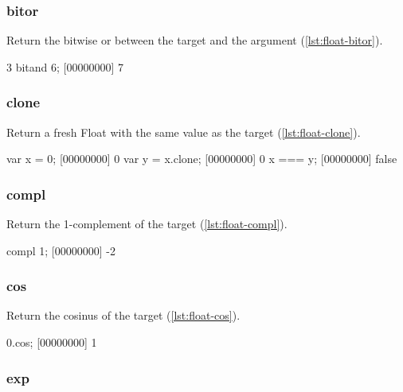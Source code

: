 \subsubsection{bitor}

Return the bitwise or between the target and the argument (\autoref{lst:float-bitor}).

\begin{urbiscript}[caption=Float.bitor, label=lst:float-bitor,
  float=\floatposh]
  3 bitand 6;
  [00000000] 7
\end{urbiscript}

\subsubsection{clone}

Return a fresh Float with the same value as the target (\autoref{lst:float-clone}).

\begin{urbiscript}[caption=Float.clone, label=lst:float-clone,
  float=\floatposh]
  var x = 0;
  [00000000] 0
  var y = x.clone;
  [00000000] 0
  x === y;
  [00000000] false
\end{urbiscript}

\subsubsection{compl}

Return the 1-complement of the target (\autoref{lst:float-compl}).

\begin{urbiscript}[caption=Float.compl, label=lst:float-compl,
  float=\floatposh]
  compl 1;
  [00000000] -2
\end{urbiscript}

\subsubsection{cos}

Return the cosinus of the target (\autoref{lst:float-cos}).

\begin{urbiscript}[caption=Float.cos, label=lst:float-cos,
  float=\floatposh]
  0.cos;
  [00000000] 1
\end{urbiscript}

\subsubsection{exp}

